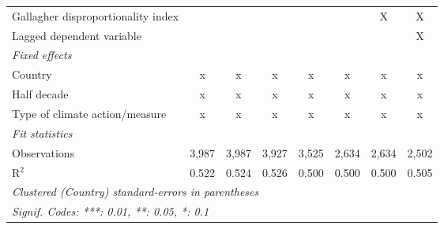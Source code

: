 \begin{tabular}{lccccccc}
   Gallagher disproportionality index                                &                &               &              &             &         & X       & X\\  
   Lagged dependent variable                                         &                &               &              &             &         &         & X\\  
   \emph{Fixed effects}\\
   Country                                                           & x              & x             & x            & x           & x       & x       & x\\  
   Half decade                                                       & x              & x             & x            & x           & x       & x       & x\\  
   Type of climate action/measure                                    & x              & x             & x            & x           & x       & x       & x\\  
   \midrule \emph{Fit statistics}\\
   Observations                                                      & 3,987          & 3,987         & 3,927        & 3,525       & 2,634   & 2,634   & 2,502\\  
   R$^2$                                                             & 0.522          & 0.524         & 0.526        & 0.500       & 0.500   & 0.500   & 0.505\\  
   \midrule
   \multicolumn{8}{l}{\emph{Clustered (Country) standard-errors in parentheses}}\\
   \multicolumn{8}{l}{\emph{Signif. Codes: ***: 0.01, **: 0.05, *: 0.1}}\\
\end{tabular}
\par\endgroup


